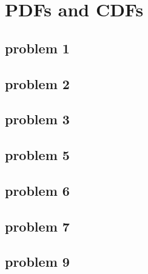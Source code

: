 \section{PDFs and CDFs}

\subsection{problem 1}

\subsection{problem 2}

\subsection{problem 3}

\subsection{problem 5}

\subsection{problem 6}

\subsection{problem 7}

\subsection{problem 9}

